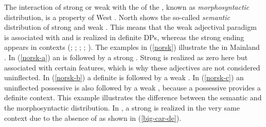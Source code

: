 \documentclass[output=paper,colorlinks,citecolor=brown]{langscibook}
\begin{document}
The interaction of strong or weak  with the  of the , known as \textit{morphosyntactic} distribution, is a property of West . North  shows the so-called \textit{semantic} distribution of strong and weak . This means that the weak adjectival paradigm is associated with  and is realized in definite DPs, whereas the strong ending appears in  contexts (\citealp{HaberlandHeltoft2008}; \citealp{Kester1993}; \citealp{Lohrmann2011}; \citealp{Pfaff2017}; \citealp{RoehrsJulien2014adjectives}).
The examples in (\ref{norsk}) illustrate the  in Mainland . In (\ref{norsk-a}) an   is followed by a strong . Strong  is realized as zero here but associated with certain features, which is why these adjectives are not considered uninflected. In (\ref{norsk-b}) a definite  is followed by a weak . In (\ref{norsk-c}) an uninflected possessive  is also followed by a weak , because a possessive  provides a definite context. This example illustrates the difference between the semantic and the morphosyntactic distribution. In , a strong  is realized in the very same context due to the absence of  as shown in (\ref{big-car-de}).

\ea \label{norsk}
\z
\z 

\z 
\end{document}
